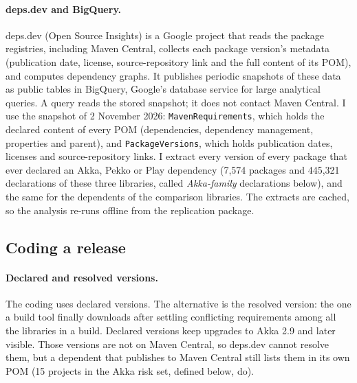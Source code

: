 \documentclass[11pt]{article}
\begin{document}
\paragraph{deps.dev and BigQuery.} deps.dev (Open Source Insights) is a Google project that reads the package registries, including Maven Central, collects each package version's metadata (publication date, license, source-repository link and the full content of its POM), and computes dependency graphs. It publishes periodic snapshots of these data as public tables in BigQuery, Google's database service for large analytical queries. A query reads the stored snapshot; it does not contact Maven Central. I use the snapshot of 2 November 2026: \texttt{MavenRequirements}, which holds the declared content of every POM (dependencies, dependency management, properties and parent), and \texttt{PackageVersions}, which holds publication dates, licenses and source-repository links. I extract every version of every package that ever declared an Akka, Pekko or Play dependency (7,574 packages and 445,321 declarations of these three libraries, called \emph{Akka-family} declarations below), and the same for the dependents of the comparison libraries. The extracts are cached, so the analysis re-runs offline from the replication package.

\subsection{Coding a release}

\paragraph{Declared and resolved versions.} The coding uses declared versions. The alternative is the resolved version: the one a build tool finally downloads after settling conflicting requirements among all the libraries in a build. Declared versions keep upgrades to Akka 2.9 and later visible. Those versions are not on Maven Central, so deps.dev cannot resolve them, but a dependent that publishes to Maven Central still lists them in its own POM (15 projects in the Akka risk set, defined below, do).
\end{document}
